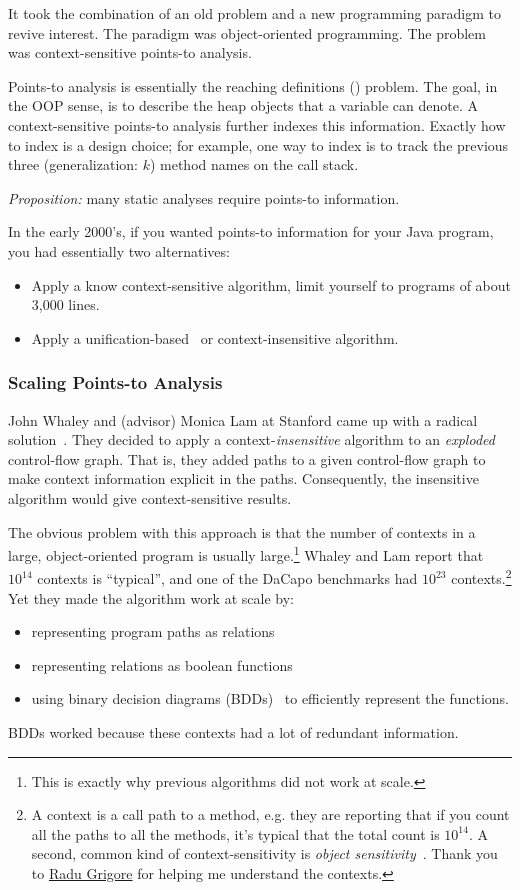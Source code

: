 \documentclass{article}
\begin{document}
It took the combination of an old problem and a new programming paradigm to revive interest.
The paradigm was object-oriented programming.
The problem was context-sensitive points-to analysis.

Points-to analysis is essentially the reaching definitions ({\rd}) problem.
The goal, in the OOP sense, is to describe the heap objects that a variable can denote.
A context-sensitive points-to analysis further indexes this information.
Exactly how to index is a design choice; for example, one way to index is to track the previous three (generalization: $k$) method names on the call stack.

\emph{Proposition:} many static analyses require points-to information.

In the early 2000's, if you wanted points-to information for your Java program, you had essentially two alternatives:
\begin{itemize}
\item Apply a know context-sensitive algorithm, limit yourself to programs of about 3,000 lines.
\item Apply a unification-based~\cite{s-popl-1995} or context-insensitive algorithm.
\end{itemize}


\subsubsection*{Scaling Points-to Analysis}

John Whaley and (advisor) Monica Lam at Stanford came up with a radical solution~\cite{wl-pldi-2004}.
They decided to apply a context-\emph{insensitive} algorithm to an \emph{exploded} control-flow graph.
That is, they added paths to a given control-flow graph to make context information explicit in the paths.
Consequently, the insensitive algorithm would give context-sensitive results.

The obvious problem with this approach is that the number of contexts in a large, object-oriented program is usually large.\footnote{This is exactly why previous algorithms did not work at scale.}
Whaley and Lam report that $10^{14}$ contexts is ``typical'', and one of the DaCapo benchmarks had $10^{23}$ contexts.\footnote{A context is a call path to a method, e.g. they are reporting that if you count all the paths to all the methods, it's typical that the total count is $10^{14}$. A second, common kind of context-sensitivity is \emph{object sensitivity}~\cite{sbl-popl-2011}. Thank you to \href{http://rgrig.appspot.com/}{Radu Grigore} for helping me understand the contexts.}
Yet they made the algorithm work at scale by:
\begin{itemize}
\item representing program paths as relations
\item representing relations as boolean functions
\item using binary decision diagrams (BDDs)~\cite{a-ieee-1978} to efficiently represent the functions.
\end{itemize}
\noindent BDDs worked because these contexts had a lot of redundant information.
\end{document}
